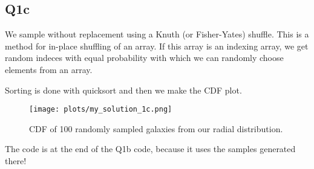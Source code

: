 \subsection{Q1c}

We sample without replacement using a Knuth (or Fisher-Yates) shuffle. This is a method for
in-place shuffling of an array. If this array is an indexing array, we get random indeces with
equal probability with which we can randomly choose elements from an array.

Sorting is done with quicksort and then we make the CDF plot.

\begin{figure}[H]
    \centering
    \texttt{[image: plots/my\_solution\_1c.png]}
    \caption{CDF of 100 randomly sampled galaxies from our radial distribution.
    }
\end{figure}

\noindent The code is at the end of the Q1b code, because it uses the samples generated there!
